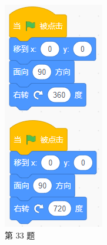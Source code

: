 \documentclass[10pt, a4paper]{article}
\begin{document}
\begin{enumerate}
\begin{figure}[htbp]
\begin{minipage}[t]{.15\textwidth}
                \caption*{第 33 题}
            \end{minipage}
            \begin{minipage}[t]{.15\textwidth}
                \centering
                \includegraphics[width=\textwidth]{34.png}

\end{minipage}
\end{figure}
\end{enumerate}
\end{document}
